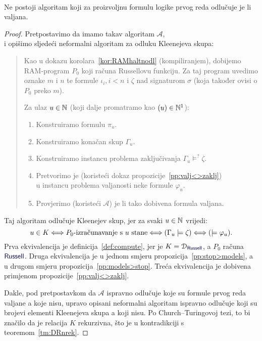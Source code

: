 \begin{teorem}\label{tm:Church}\ \\
Ne postoji algoritam koji za proizvoljnu formulu logike prvog reda odlučuje je li valjana.
\end{teorem}
\begin{proof}
Pretpostavimo da imamo takav algoritam $\mathcal A$,\\ i opišimo sljedeći neformalni algoritam za odluku Kleenejeva skupa:
\begin{quote}
Kao u dokazu korolara~\ref{kor:RAMhaltnodl} (kompiliranjem), dobijemo RAM-program $P_0$ koji računa Russellovu funkciju. Za taj program uvedimo oznake $m$ i $n$ te formule $\iota_i,i<n$ i $\zeta$ nad signaturom $\sigma$ (koja također ovisi o $P_0$ preko $m$).

Za ulaz $u\in{\mathbb N}$ (koji dalje promatramo kao $(u)\in{\mathbb N}^1$):
\begin{enumerate}
    \item Konstruiramo formulu $\pi_u$.
    \item Konstruiramo konačan skup $\Gamma_u$.
    \item Konstruiramo instancu problema zaključivanja $\Gamma_u%
    \models^?
    \zeta$.
    \item\label{step:varphi_u} Pretvorimo je (koristeći dokaz propozicije~\ref{pp:valj<>zaklj})\\ u instancu problema valjanosti neke formule $\varphi_u$.
    \item Provjerimo (koristeći $\mathcal A$) je li tako dobivena formula valjana.
\end{enumerate}
\end{quote}
Taj algoritam odlučuje Kleenejev skup, jer za svaki $u\in{\mathbb N}$ vrijedi:%
\begin{equation}\label{eq:lanaceqv}
    u\in K\Longleftrightarrow\text{$P_0$-izračunavanje s $u$ stane}\Longleftrightarrow(\Gamma_u\models\zeta)\Longleftrightarrow{}(\models\varphi_u)\text.
\end{equation}
Prva ekvivalencija je definicija~\ref{def:compute}, jer je $K=\dom{\f{Russell}}$, a $P_0$ računa $\f{Russell}$. Druga ekvivalencija je u jednom smjeru propozicija~\ref{pp:stop>models}, a u drugom smjeru propozicija~\ref{pp:models>stop}. Treća ekvivalencija je dobivena primjenom propozicije~\ref{pp:valj<>zaklj}.

Dakle, pod pretpostavkom da $\mathcal A$ ispravno odlučuje koje su formule prvog reda valjane a koje nisu, upravo opisani neformalni algoritam ispravno odlučuje koji su brojevi elementi Kleenejeva skupa a koji nisu. Po Church--\!Turingovoj tezi, to bi značilo da je relacija $K$ rekurzivna, što je u kontradikciji s teoremom~\ref{tm:DRnrek}.
\end{proof}


